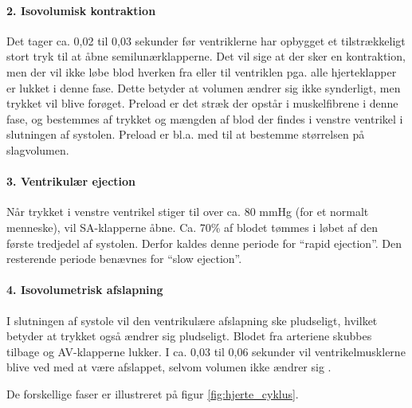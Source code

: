 \paragraph*{2. Isovolumisk kontraktion}
Det tager ca. 0,02 til 0,03 sekunder før ventriklerne har opbygget et tilstrækkeligt stort tryk til at åbne semilunærklapperne. Det vil sige at der sker en kontraktion, men der vil ikke løbe blod hverken fra eller til ventriklen pga. alle hjerteklapper er lukket i denne fase. Dette betyder at volumen ændrer sig ikke synderligt, men trykket vil blive forøget. Preload er det stræk der opstår i muskelfibrene i denne fase, og bestemmes af trykket og mængden af blod der findes i venstre ventrikel i slutningen af systolen. Preload er bl.a. med til at bestemme størrelsen på slagvolumen.

\paragraph*{3. Ventrikulær ejection}
Når trykket i venstre ventrikel stiger til over ca. 80 mmHg (for et normalt menneske), vil SA-klapperne åbne. Ca. 70\% af blodet tømmes i løbet af den første tredjedel af systolen. Derfor kaldes denne periode for “rapid ejection”. Den resterende periode benævnes for “slow ejection”.

\paragraph*{4. Isovolumetrisk afslapning}
I slutningen af systole vil den ventrikulære afslapning ske pludseligt, hvilket betyder at trykket også ændrer sig pludseligt. Blodet fra arteriene skubbes tilbage og AV-klapperne lukker. I ca. 0,03 til 0,06 sekunder vil ventrikelmusklerne blive ved med at være  afslappet, selvom volumen ikke ændrer sig \cite{guyton} \cite{cindy}. 

\noindent De forskellige faser er illustreret på figur \ref{fig:hjerte_cyklus}.\\



